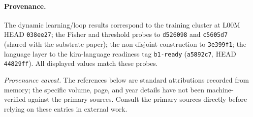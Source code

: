 \documentclass[11pt]{article}
\theoremstyle{plain}
\theoremstyle{definition}
\theoremstyle{remark}
\begin{document}
\paragraph{Provenance.} The dynamic learning/loop results correspond to the training cluster at L00M HEAD
\texttt{038ee27}; the Fisher and threshold probes to \texttt{d526098} and \texttt{c5605d7} (shared with the
substrate paper); the non-disjoint construction to \texttt{3e399f1}; the language layer to the kira-language
readiness tag \texttt{b1-ready} (\texttt{a5892c7}, HEAD \texttt{44829ff}). All displayed values match these
probes.

\smallskip
\noindent\footnotesize\emph{Provenance caveat.} The references below are standard attributions recorded from memory;
the specific volume, page, and year details have not been machine-verified against the primary sources. Consult
the primary sources directly before relying on these entries in external work.\normalsize
\end{document}
